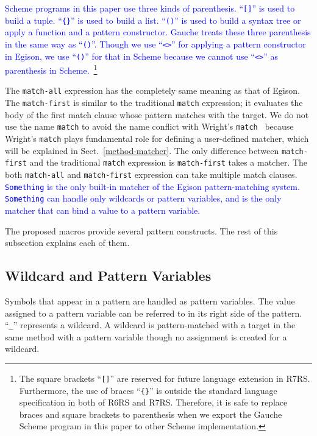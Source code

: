 \documentclass[acmlarge]{acmart}
\newcommand{\new}[1]{\textcolor{blue}{#1}}
\begin{document}
\new{
Scheme programs in this paper use three kinds of parenthesis.
``\lstinline{[]}'' is used to build a tuple.
``\texttt{\{\}}'' is used to build a list. %
``\lstinline{()}'' is used to build a syntax tree or apply a function and a pattern constructor.
Gauche treats these three parenthesis in the same way as ``\lstinline{()}''.
Though we use ``\lstinline{<>}'' for applying a pattern constructor in Egison, we use ``\lstinline{()}'' for that in Scheme because we cannot use ``\lstinline{<>}'' as parenthesis in Scheme.~\footnote{The square brackets ``\lstinline{[]}'' are reserved for future language extension in R7RS.
Furthermore, the use of braces ``\texttt{\{\}}'' is outside the standard language specification in both of R6RS and R7RS.
Therefore, it is safe to replace braces and square brackets to parenthesis when we export the Gauche Scheme program in this paper to other Scheme implementation.
}
}%

The \texttt{match-all} expression has the completely same meaning as that of Egison.
The \texttt{match-first} is similar to the traditional \texttt{match} expression; it evaluates the body of the first match clause whose pattern matches with the target.
We do not use the name \texttt{match} to avoid the name conflict with Wright's \texttt{match}~\cite{wright1993pattern} because Wright's \texttt{match} plays fundamental role for defining a user-defined matcher, which will be explained in Sect.~\ref{method-matcher}.
The only difference between \texttt{match-first} and the traditional \texttt{match} expression is \texttt{match-first} takes a matcher.
The both \texttt{match-all} and \texttt{match-first} expression can take multiple match clauses.
\new{
\lstinline{Something} is the only built-in matcher of the Egison pattern-matching system.
\lstinline{Something} can handle only wildcards or pattern variables, and is the only matcher that can bind a value to a pattern variable.
}%

The proposed macros provide several pattern constructs.
The rest of this subsection explains each of them.

\subsection{Wildcard and Pattern Variables}

Symbols that appear in a pattern are handled as pattern variables.
The value assigned to a pattern variable can be referred to in its right side of the pattern.
``\lstinline{_}'' represents a wildcard.
A wildcard is pattern-matched with a target in the same method with a pattern variable though no assignment is created for a wildcard.
\end{document}
